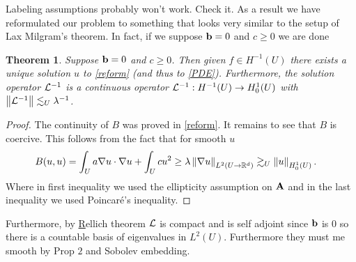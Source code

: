 \documentclass[12pt]{article}
\newtheorem{theorem}{Theorem}[section]
\theoremstyle{definition}
\newcommand{\red}[1]{{\color{red}#1}}
\renewcommand{\norm}[1]{\left\lVert #1 \right\rVert}\renewcommand{\abs}[1]{\left| #1 \right|}
\begin{document}
\red{Labeling assumptions probably won't work. Check it.}
As a result we have reformulated our problem to something that looks very similar to the setup of Lax Milgram's theorem. In fact, if we suppose $\vb{b}=0$ and $c \geq 0$ we are done
\begin{theorem}
  Suppose $\vb{b}=0$  and $c \geq 0$. Then given $f \in  H^{-1}(U)$ there exists a unique solution $u$ to \eqref{reform} (and thus to \eqref{PDE}). Furthermore, the solution operator $\mathcal{L}^{-1}$ is a continuous operator	 $\mathcal{L}^{-1}: H^{-1}(U) \to H^1_0(U)$ with $\norm{\Ll^{-1}} \lesssim_U \lambda ^{-1}$.
\end{theorem}
\begin{proof}
  The continuity of $B$ was proved in  \eqref{reform}. It remains to see that $B$ is coercive. This follows from the fact that for smooth $u$
  \begin{align}\label{b=0}
    B(u,u) & = \int_{U}a \nabla u \cdot \nabla u + \int_{U} cu^2 \geq \lambda \norm{\nabla u}_{L^2(U \to \R^d)} \gtrsim_U \norm{u}_{H^1_0(U)}.
  \end{align}
  Where in first inequality we used the ellipticity assumption on $\vb{A}$ and in the last inequality we used Poincaré's inequality.
\end{proof}
Furthermore, by \href{https://nowheredifferentiable.com/2023-07-12-PDEs-3-Sobolev_spaces/#:~:text=Theorem%2014%20(-,Rellich,-for%20trace%200}Rellich theorem $\mathcal{L}$ is compact and is self adjoint since $\vb{b}$ is  $0$ so there is a countable basis of eigenvalues in  $L^2(U)$. Furthermore they must me smooth by Prop  $2$ and Sobolev embedding.
\end{document}
